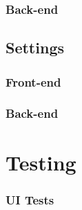     \subsubsection{Back-end}
    \label{app:friends_backend}
    
    
    \subsection{Settings}
    \subsubsection{Front-end}
    \label{app:settings_frontend}
    
    \subsubsection{Back-end}
    
    
    \section{Testing}
    \subsubsection{UI Tests}
    \label{app:testing_backend}
    